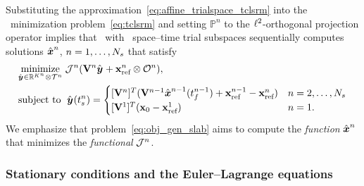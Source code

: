 Substituting the approximation~\eqref{eq:affine_trialspace_tclsrm} into the
\methodAcronym\ minimization problem~\eqref{eq:tclsrm} and setting 
$\mathbb{P}^n$ to the 
$\ell^2$-orthogonal projection operator 
implies that 
\methodAcronym\ with \spatialAcronym\ space--time trial subspaces
sequentially computes solutions
$\hat{ \boldsymbol x}^{n}$, $n = 1,\ldots,N_s$ that satisfy
\begin{equation}\label{eq:obj_gen_slab}
\begin{split}
	& \underset{\genstateyArgnt{} \in \RR{\romdimArg{n}} \otimes \timeSpaceArg{n}
			}{\text{minimize}}\; \mathcal{J}^n(\basismatArg{n} \genstateyArgnt{} +
			\stateInterceptArg{n} \otimes \onesFunction^n), \\ 
      & \text{subject to }\; \genstateyArg{}{\timeStartArg{n}} =
	\begin{cases}
\spatialIC & n = 2,\ldots,\nslabs \\
\genstateICOne & n=1. \end{cases} 
\end{split}
\end{equation}
We emphasize that problem~\eqref{eq:obj_gen_slab} aims to compute the
\textit{function} $\hat{ \boldsymbol x}^n$ that minimizes the \textit{functional}
	$\mathcal{J}^{n}$. 	%

\subsubsection{Stationary conditions and the Euler--Lagrange equations}

